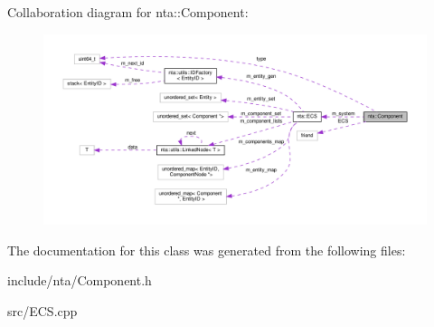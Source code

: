 Collaboration diagram for nta\+:\+:Component\+:
\nopagebreak
\begin{figure}[H]
\begin{center}
\leavevmode
\includegraphics[width=350pt]{d2/de4/classnta_1_1Component__coll__graph}
\end{center}
\end{figure}


The documentation for this class was generated from the following files\+:\begin{DoxyCompactItemize}
\item 
include/nta/Component.\+h\item 
src/E\+C\+S.\+cpp\end{DoxyCompactItemize}
